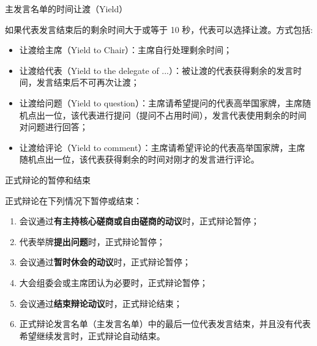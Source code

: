 \documentclass{beamer}
\begin{document}
\begin{frame}{主发言名单的时间让渡（Yield）}

如果代表发言结束后的剩余时间大于或等于 10 秒，代表可以选择让渡。方式包括:
\begin{itemize}
\item 让渡给主席（Yield to Chair）：主席自行处理剩余时间；
\item 让渡给代表（Yield to the delegate of ...）：被让渡的代表获得剩余的发言时间，发言结束后不可再次让渡；
\item 让渡给问题（Yield to question）：主席请希望提问的代表高举国家牌，主席随机点出一位，该代表进行提问（提问不占用时间），发言代表使用剩余的时间对问题进行回答；
\item 让渡给评论（Yield to comment）：主席请希望评论的代表高举国家牌，主席随机点出一位，该代表获得剩余的时间对刚才的发言进行评论。
\end{itemize}

\end{frame}

\begin{frame}{正式辩论的暂停和结束}

正式辩论在下列情况下暂停或结束：

\begin{enumerate}
\item 会议通过\textbf{有主持核心磋商或自由磋商的动议}时，正式辩论暂停；
\item 代表举牌\textbf{提出问题}时，正式辩论暂停；
\item 会议通过\textbf{暂时休会的动议}时，正式辩论暂停；
\item 大会组委会或主席团认为必要时，正式辩论暂停；
\item 会议通过\textbf{结束辩论动议}时，正式辩论结束；
\item 正式辩论发言名单（主发言名单）中的最后一位代表发言结束，并且没有代表希望继续发言时，正式辩论自动结束。
\end{enumerate}

\end{frame}
\end{document}

